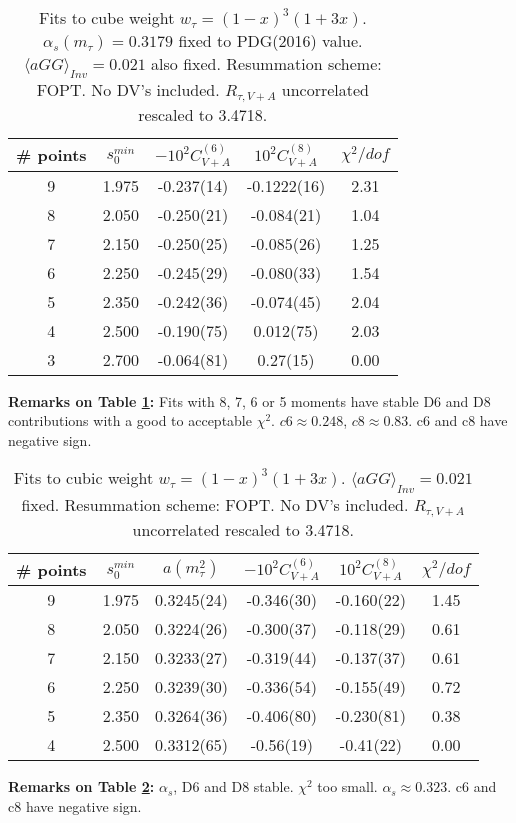 \documentclass[12pt]{article}
\begin{document}
\begin{table}
  \centering
  \begin{tabular}{ | c c c c c | }
    \hline
    \# points & $s_0^{min}$ & $-10^2 C_{V+A}^{(6)}$ & $10^2 C_{V+A}^{(8)}$ & $\chi^2/dof$ \\ 
    \hline
    9 & 1.975 & -0.237(14) & -0.1222(16) & 2.31 \\ 
    8 & 2.050 & -0.250(21) & -0.084(21) & 1.04 \\
    7 & 2.150 & -0.250(25) & -0.085(26) & 1.25 \\
    6 & 2.250 & -0.245(29) & -0.080(33) & 1.54 \\
    5 & 2.350 & -0.242(36) & -0.074(45) & 2.04 \\
    4 & 2.500 & -0.190(75) & 0.012(75) & 2.03 \\
    3 & 2.700 & -0.064(81)  & 0.27(15) & 0.00 \\
    \hline
  \end{tabular}
  \caption{Fits to cube weight $w_{\tau} = (1 - x)^3 (1 + 3x)$.
    $\alpha_s(m_{\tau}) = 0.3179$ fixed to PDG(2016) value. $\langle aGG
    \rangle_{Inv} = 0.021$ also fixed. Resummation scheme: FOPT. No DV's included.
    $R_{\tau, V+A}$ uncorrelated rescaled to 3.4718.}
  \label{table:wCube}
\end{table}
\textbf{Remarks on Table \ref{table:wCube}:} 
Fits with 8, 7, 6 or 5 moments have stable D6 and D8 contributions with a good
to acceptable $\chi^2$. $c6 \approx 0.248$, $c8 \approx 0.83$. c6 and c8 have
negative sign.

\begin{table}
  \centering
  \begin{tabular}{ | c c c c c c | }
    \hline
    \# points & $s_0^{min}$ & $a(m_\tau^2)$ & $-10^2 C_{V+A}^{(6)}$ & $10^2 C_{V+A}^{(8)}$ & $\chi^2/dof$ \\ 
    \hline
    9 & 1.975 & 0.3245(24) & -0.346(30) & -0.160(22)   & 1.45 \\ 
    8 & 2.050 & 0.3224(26) & -0.300(37) & -0.118(29) & 0.61 \\
    7 & 2.150 & 0.3233(27) & -0.319(44) & -0.137(37) & 0.61 \\
    6 & 2.250 & 0.3239(30) & -0.336(54) & -0.155(49) & 0.72 \\
    5 & 2.350 & 0.3264(36) & -0.406(80) & -0.230(81) & 0.38 \\
    4 & 2.500 & 0.3312(65) & -0.56(19)  & -0.41(22)  & 0.00 \\
    \hline
  \end{tabular}
  \caption{Fits to cubic weight $w_{\tau} = (1 - x)^3 (1 + 3x)$.
    $\langle aGG \rangle_{Inv} = 0.021$ fixed. Resummation scheme: FOPT. No DV's included.
    $R_{\tau, V+A}$ uncorrelated rescaled to 3.4718.}
  \label{table:wCubeAlpha}
\end{table}
\textbf{Remarks on Table \ref{table:wCubeAlpha}:} 
$\alpha_s$, D6 and D8 stable. $\chi^2$ too small. $\alpha_s \approx 0.323$. c6
and c8 have negative sign.
\end{document}
